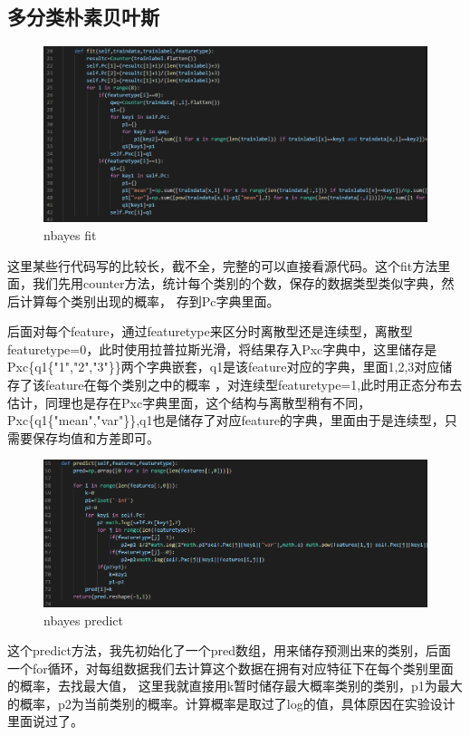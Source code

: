\documentclass{report}
\begin{document}
    \subsection{多分类朴素贝叶斯}
    \begin{figure}[H]
        \centering
        \includegraphics[width=15cm]{3.png}
        \caption{nbayes fit}
    \end{figure}
    这里某些行代码写的比较长，截不全，完整的可以直接看源代码。这个fit方法里面，我们先用counter方法，统计每个类别的个数，保存的数据类型类似字典，然后计算每个类别出现的概率，
    存到Pc字典里面。

    后面对每个feature，通过featuretype来区分时离散型还是连续型，离散型featuretype=0，此时使用拉普拉斯光滑，将结果存入Pxc字典中，这里储存是Pxc\{q1\{"1","2","3"\}\}两个字典嵌套，q1是该feature对应的字典，里面1,2,3对应储存了该feature在每个类别之中的概率
    ，对连续型featuretype=1,此时用正态分布去估计，同理也是存在Pxc字典里面，这个结构与离散型稍有不同，Pxc\{q1\{"mean","var"\}\},q1也是储存了对应feature的字典，里面由于是连续型，只需要保存均值和方差即可。
    \begin{figure}[H]
        \centering
        \includegraphics[width=15cm]{4.png}
        \caption{nbayes predict}
    \end{figure}
    这个predict方法，我先初始化了一个pred数组，用来储存预测出来的类别，后面一个for循环，对每组数据我们去计算这个数据在拥有对应特征下在每个类别里面的概率，去找最大值，
    这里我就直接用k暂时储存最大概率类别的类别，p1为最大的概率，p2为当前类别的概率。计算概率是取过了log的值，具体原因在实验设计里面说过了。\par 
\end{document}
